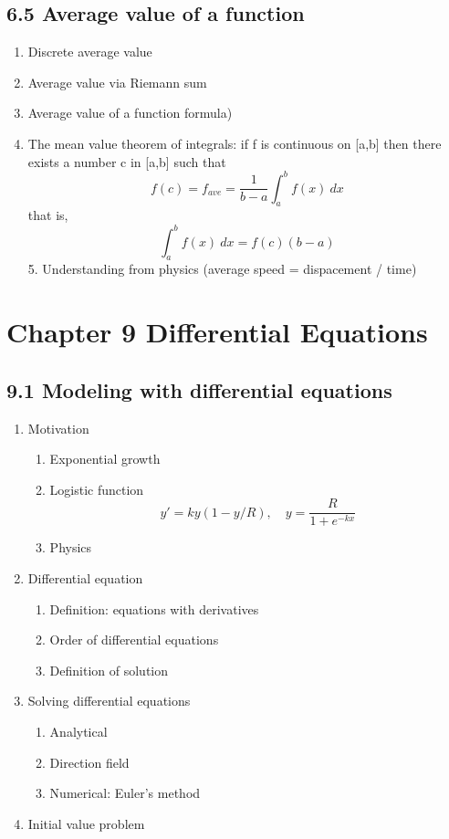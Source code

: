 \documentclass{article}
\begin{document}
\subsection{6.5 Average value of a function}
\begin{enumerate}
\item Discrete average value
\item Average value via Riemann sum
\item Average value of a function formula)
\item The mean value theorem of integrals: if f is continuous on [a,b] then there exists a number c in [a,b] such that 
$$
f(c) = f_{ave} = \frac{1}{b-a}\int_a^bf(x)~dx
$$
that is,
$$
\int_a^bf(x)~dx = f(c)(b-a)
$$
5. Understanding from physics (average speed = dispacement / time)
\end{enumerate}
\section{Chapter 9 Differential Equations}
\subsection{9.1 Modeling with differential equations}
\begin{enumerate}
\item Motivation
\begin{enumerate}
\item Exponential growth
\item Logistic function
$$
y' = ky(1-y/R),\quad y = \frac{R}{1+e^{-kx}}
$$
\item Physics
\end{enumerate}
\item Differential equation
\begin{enumerate}
\item Definition: equations with derivatives
\item Order of differential equations
\item Definition of solution
\end{enumerate}
\item Solving differential equations
\begin{enumerate}
\item Analytical
\item Direction field
\item Numerical: Euler's method
\end{enumerate}
\item Initial value problem
\end{enumerate}
\end{document}
